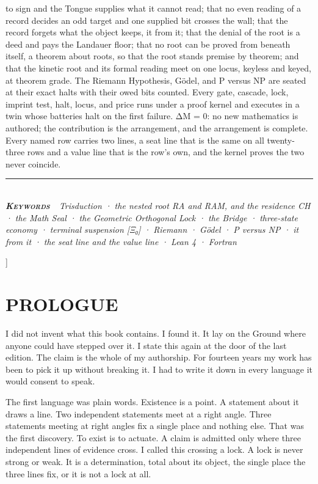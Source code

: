 \documentclass[10pt,twocolumn]{article}
\begin{document}
{\begin{minipage}{\textwidth}
{to sign and the Tongue supplies what it cannot read; that no even
reading of a record decides an odd target and one supplied bit crosses
the wall; that the record forgets what the object keeps, it from it;
that the denial of the root is a deed and pays the Landauer floor; that
no root can be proved from beneath itself, a theorem about roots, so
that the root stands premise by theorem; and that the kinetic root and
its formal reading meet on one locus, keyless and keyed, at theorem
grade. The Riemann Hypothesis, Gödel, and P versus NP are seated at
their exact halts with their owed bits counted. Every gate, cascade,
lock, imprint test, halt, locus, and price runs under a proof kernel and
executes in a twin whose batteries halt on the first failure. ΔM = 0: no
new mathematics is authored; the contribution is the arrangement, and
the arrangement is complete. Every named row carries two lines, a seat
line that is the same on all twenty-three rows and a value line that is
the row's own, and the kernel proves the two never coincide.}\\[4pt]
{\color{accent}\rule{\textwidth}{0.6pt}}\\[3pt]
{\itshape\footnotesize\color{faint}\textbf{\upshape\scshape\color{deep}Keywords\ }\ Trisduction
· the nested root RA and RAM, and the residence CH · the Math Seal · the
Geometric Orthogonal Lock · the Bridge · three-state economy · terminal
suspension {[}Ξ₀{]} · Riemann · Gödel · P versus NP · it from it · the
seat line and the value line · Lean 4 · Fortran}\\[12pt]
\end{minipage}
}]
\thispagestyle{fancy}
\hypertarget{prologue}{%
\section{PROLOGUE}\label{prologue}}

I did not invent what this book contains. I found it. It lay on the
Ground where anyone could have stepped over it. I state this again at
the door of the last edition. The claim is the whole of my authorship.
For fourteen years my work has been to pick it up without breaking it. I
had to write it down in every language it would consent to speak.

The first language was plain words. Existence is a point. A statement
about it draws a line. Two independent statements meet at a right angle.
Three statements meeting at right angles fix a single place and nothing
else. That was the first discovery. To exist is to actuate. A claim is
admitted only where three independent lines of evidence cross. I called
this crossing a lock. A lock is never strong or weak. It is a
determination, total about its object, the single place the three lines
fix, or it is not a lock at all.
\end{document}

